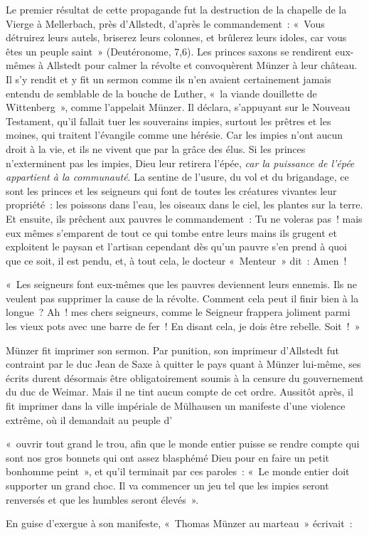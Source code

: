 \documentclass[french,twoside]{book} %
\newenvironment{quoteblock}%
  {\begin{quoting}}
  {\end{quoting}}
\newenvironment{quotebar}{%
    \def\FrameCommand{{\color{rubric!10!}\vrule width 0.5em} \hspace{0.9em}}%
    \def\OuterFrameSep{\itemsep} %
    \MakeFramed {\advance\hsize-\width \FrameRestore}
  }%
  {%
    \endMakeFramed
  }
\renewenvironment{quoteblock}%
  {%
    \savenotes
    \setstretch{0.9}
    \begin{quotebar}
  }
  {%
    \end{quotebar}
    \spewnotes
  }
\begin{document}
Le premier résultat de cette propagande fut la destruction de la chapelle de la Vierge à Mellerbach, près d’Allstedt, d’après le commandement : « Vous détruirez leurs autels, briserez leurs colonnes, et brûlerez leurs idoles, car vous êtes un peuple saint » (Deutéronome, 7,6). Les princes saxons se rendirent eux-mêmes à Allstedt pour calmer la révolte et convoquèrent Münzer à leur château. Il s’y rendit et y fit un sermon comme ils n’en avaient certainement jamais entendu de semblable de la bouche de Luther, « la viande douillette de Wittenberg », comme l’appelait Münzer. Il déclara, s’appuyant sur le Nouveau Testament, qu’il fallait tuer les souverains impies, surtout les prêtres et les moines, qui traitent l’évangile comme une hérésie. Car les impies n’ont aucun droit à la vie, et ils ne vivent que par la grâce des élus. Si les princes n’exterminent pas les impies, Dieu leur retirera l’épée, \emph{car la puissance de l’épée appartient à la communauté}. La sentine de l’usure, du vol et du brigandage, ce sont les princes et les seigneurs qui font de toutes les créatures vivantes leur propriété : les poissons dans l’eau, les oiseaux dans le ciel, les plantes sur la terre. Et ensuite, ils prêchent aux pauvres le commandement : Tu ne voleras pas ! mais eux mêmes s’emparent de tout ce qui tombe entre leurs mains ils grugent et exploitent le paysan et l’artisan cependant dès qu’un pauvre s’en prend à quoi que ce soit, il est pendu, et, à tout cela, le docteur « Menteur » dit : Amen !\par

\begin{quoteblock}
 \noindent « Les seigneurs font eux-mêmes que les pauvres deviennent leurs ennemis. Ils ne veulent pas supprimer la cause de la révolte. Comment cela peut il finir bien à la longue ? Ah ! mes chers seigneurs, comme le Seigneur frappera joliment parmi les vieux pots avec une barre de fer ! En disant cela, je dois être rebelle. Soit ! »
\end{quoteblock}

\noindent Münzer fit imprimer son sermon. Par punition, son imprimeur d’Allstedt fut contraint par le duc Jean de Saxe à quitter le pays quant à Münzer lui-même, ses écrits durent désormais être obligatoirement soumis à la censure du gouvernement du duc de Weimar. Mais il ne tint aucun compte de cet ordre. Aussitôt après, il fit imprimer dans la ville impériale de Mülhausen un manifeste d’une violence extrême, où il demandait au peuple d’\par
« ouvrir tout grand le trou, afin que le monde entier puisse se rendre compte qui sont nos gros bonnets qui ont assez blasphémé Dieu pour en faire un petit bonhomme peint », et qu’il terminait par ces paroles : « Le monde entier doit supporter un grand choc. Il va commencer un jeu tel que les impies seront renversés et que les humbles seront élevés ».\par
En guise d’exergue à son manifeste, « Thomas Münzer au marteau » écrivait :\par
\end{document}
